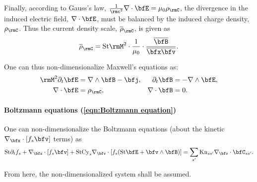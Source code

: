     Finally, according to Gauss's law, $\frac{1}{\rmc^{2}}\nabla\cdot\bfE  =  \mu_{0}\rho_{\rmC}$, the divergence in the induced electric field, $\nabla\cdot\bfE$, must be balanced by the induced charge density, $\rho_{\rmC}$. Thus the current density scale, $\overline{\rho}_{\rmC}$, is given as
    \begin{equation}
        \overline{\rho}_{\rmC}  =  \rmSt\rmM^{2}\cdot\frac{1}{\mu_{0}}\cdot\frac{\overline{\bfB}}{\overline{\bfx}\overline{\bfv}}.
    \end{equation}
    
    One can thus non-dimensionalize Maxwell's equations as:
    \begin{align}
        \rmM^{2}\partial_{t}\bfE  &=  \nabla\wedge\bfB - \bfj,  &
        \partial_{t}\bfB  &=  - \nabla\wedge\bfE,  \\
        \nabla\cdot\bfE  &=  \rho_{\rmC},  &
        \nabla\cdot\bfB  &=  0.
    \end{align}

    \paragraph*{Boltzmann equations (\ref{eqn:Boltzmann equation})} One can non-dimensionalize the Boltzmann equations (about the kinetic $\nabla_{\bfx}\cdot[f_{s}\bfv]$ terms) as
    \begin{equation}
        \rmSt\partial_{t}f_{s} + \nabla_{\bfx}\cdot[f_{s}\bfv] + \rmSt\rmCy_{s}\nabla_{\bfv}\cdot[f_{s}(\rmSt\bfE + \bfv\wedge\bfB)]  =   \sum_{s'}\rmKn_{ss'}\nabla_{\bfv}\cdot\bfC_{ss'}.
    \end{equation}
    
    \shortline

    From here, the non-dimensionalized system shall be assumed.